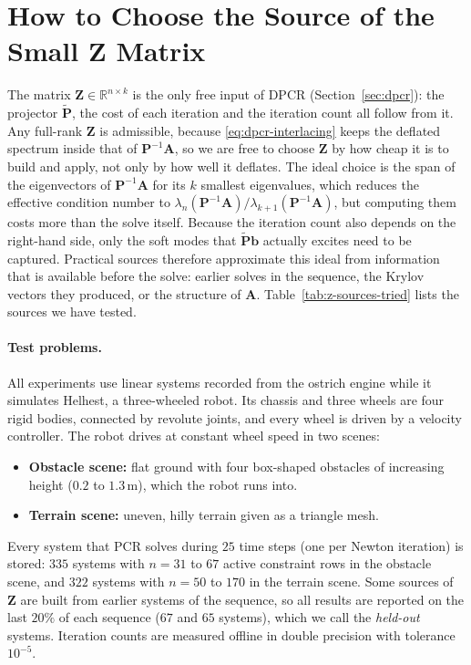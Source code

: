 \section{How to Choose the Source of the Small $\mathbf{Z}$ Matrix}
\label{sec:choosing-z}

The matrix $\mathbf{Z} \in \mathbb{R}^{n \times k}$ is the only free input of
DPCR (Section~\ref{sec:dpcr}): the projector $\tilde{\mathbf{P}}$, the cost
of each iteration and the iteration count all follow from it. Any full-rank
$\mathbf{Z}$ is admissible, because \eqref{eq:dpcr-interlacing} keeps the
deflated spectrum inside that of $\mathbf{P}^{-1}\mathbf{A}$, so we are free
to choose $\mathbf{Z}$ by how cheap it is to build and apply, not only by
how well it deflates. The ideal choice is the span of the eigenvectors of
$\mathbf{P}^{-1}\mathbf{A}$ for its $k$ smallest eigenvalues, which reduces
the effective condition number to
$\lambda_n(\mathbf{P}^{-1}\mathbf{A})/\lambda_{k+1}(\mathbf{P}^{-1}\mathbf{A})$,
but computing them costs more than the solve itself. Because the iteration
count also depends on the right-hand side, only the soft modes that
$\tilde{\mathbf{P}}\mathbf{b}$ actually excites need to be captured.
Practical sources therefore approximate this ideal from information that is
available before the solve: earlier solves in the sequence, the Krylov
vectors they produced, or the structure of $\mathbf{A}$.
Table~\ref{tab:z-sources-tried} lists the sources we have tested.

\paragraph{Test problems.}
All experiments use linear systems recorded from the ostrich engine while it
simulates Helhest, a three-wheeled robot. Its chassis and three wheels are
four rigid bodies, connected by revolute joints, and every wheel is driven by
a velocity controller. The robot drives at constant wheel speed in two
scenes:
\begin{itemize}
  \item \textbf{Obstacle scene:} flat ground with four box-shaped obstacles
    of increasing height ($0.2$ to $1.3$\,m), which the robot runs into.
  \item \textbf{Terrain scene:} uneven, hilly terrain given as a triangle
    mesh.
\end{itemize}
Every system that PCR solves during $25$ time steps (one per Newton
iteration) is stored: $335$ systems with $n = 31$ to $67$ active constraint
rows in the obstacle scene, and $322$ systems with $n = 50$ to $170$ in the
terrain scene. Some sources of $\mathbf{Z}$ are built from earlier systems
of the sequence, so all results are reported on the last $20\%$ of each
sequence ($67$ and $65$ systems), which we call the \emph{held-out}
systems. Iteration counts are measured offline in double precision with
tolerance $10^{-5}$.

